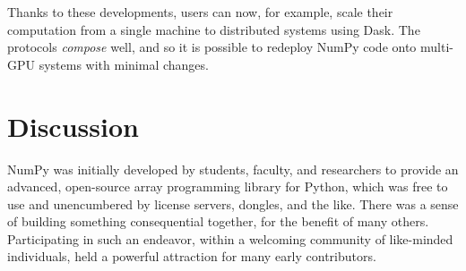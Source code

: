 Thanks to these developments, users can now, for example, scale
their computation from a single machine to distributed systems using Dask. The protocols
\textit{compose} well, and so it is possible to redeploy NumPy code onto multi-GPU systems with minimal changes\cite{entschev2019}.






\section*{Discussion}

NumPy was initially developed by students, faculty, and researchers to
provide an advanced, open-source array programming library for Python,
which was free to use and unencumbered by license servers, dongles, and the like.
There was a sense of building something consequential together,
for the benefit of many others.  Participating in
such an endeavor, within a welcoming community of like-minded
individuals, held a powerful attraction for many early contributors.

